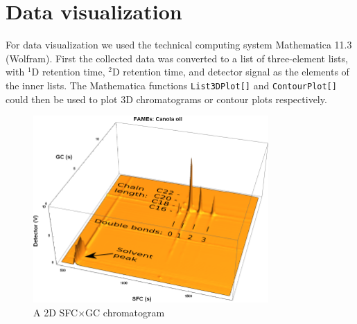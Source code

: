 \section{Data visualization}
For data visualization we used the technical computing system Mathematica
11.3\texttrademark{} (Wolfram).  First the collected data was converted to a
list of three-element lists, with $^1$D retention time, $^2$D retention time,
and detector signal as the elements of the inner lists. The Mathematica
functions \texttt{List3DPlot[]} and \texttt{ContourPlot[]} could then be used to
plot 3D chromatograms or contour plots respectively.

\begin{figure}
	\centering
	\includegraphics[width=0.8\textwidth]{./Figures/Interpretation.png}
	\decoRule
	\caption[A 2D SFC×GC chromatogram]{A 2D SFC×GC chromatogram}	
	\label{fig:MeasurementCurve}
\end{figure}



\todos

